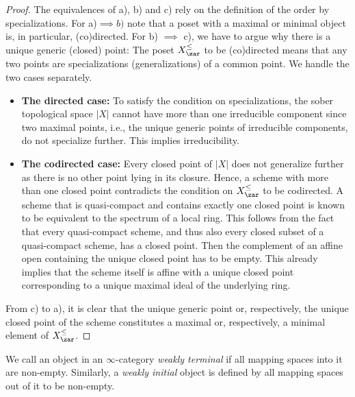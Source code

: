 \documentclass[leqno]{article}
\renewcommand{\Gal}{\mathrm{Gal}}
\newcommand{\Zpos}[1]{{#1}_{\zar}^{\leq}}
\begin{document}
\begin{proof}
The equivalences of a), b) and c) rely on the definition of the order by specializations.
For a)$\implies b)$ note that a poset with a maximal or minimal object is, in particular, (co)directed. For  b) $\implies$ c), we have to argue why there is a unique generic (closed) point:
The poset $ \Zpos{X}$ to be (co)directed means that any two points are specializations (generalizations) of a common point.
We handle the two cases separately.
\begin{itemize}
    \item[\textbf{1.}] \textbf{The directed case:}
    To satisfy the condition on specializations, the sober topological space $|X|$ cannot have more than one irreducible component since two maximal points, i.e., the unique generic points of irreducible components, do not specialize further.
    This implies irreducibility.
    \item[\textbf{2.}] \textbf{The codirected case:}
    Every closed point of $|X|$ does not generalize further as there is no other point lying in its closure. Hence, a scheme with more than one closed point contradicts the condition on $ \Zpos{X}$ to be codirected.
    A scheme that is quasi-compact and contains exactly one closed point is known to be equivalent to the spectrum of a local ring.
    This follows from the fact that every quasi-compact scheme, and thus also every closed subset of a quasi-compact scheme, has a closed point.
    Then the complement of an affine open containing the unique closed point has to be empty.
    This already implies that the scheme itself is affine with a unique closed point corresponding to a unique maximal ideal of the underlying ring.
    \end{itemize}
From c) to a), it is clear that the unique generic point or, respectively, the unique closed point of the scheme constitutes a maximal or, respectively, a minimal element of $ \Zpos{X}$.
\end{proof}
%
%
\begin{definition}
We call an object in an $\infty$-category \textit{weakly terminal} if all mapping spaces into it are non-empty. Similarly, a \textit{weakly initial} object is defined by all mapping spaces out of it to be non-empty.  
\end{definition}
\end{document}

